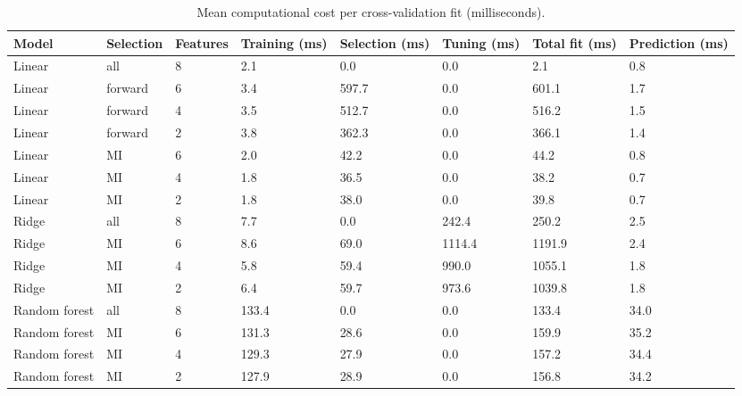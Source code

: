 \begin{table}[t]
\centering
\caption{Mean computational cost per cross-validation fit (milliseconds).}
\label{tab:cv_cost}
\begin{tabular}{llllllll}
\toprule
Model & Selection & Features & Training (ms) & Selection (ms) & Tuning (ms) & Total fit (ms) & Prediction (ms) \\
\midrule
Linear & all & 8 & 2.1 & 0.0 & 0.0 & 2.1 & 0.8 \\
Linear & forward & 6 & 3.4 & 597.7 & 0.0 & 601.1 & 1.7 \\
Linear & forward & 4 & 3.5 & 512.7 & 0.0 & 516.2 & 1.5 \\
Linear & forward & 2 & 3.8 & 362.3 & 0.0 & 366.1 & 1.4 \\
Linear & MI & 6 & 2.0 & 42.2 & 0.0 & 44.2 & 0.8 \\
Linear & MI & 4 & 1.8 & 36.5 & 0.0 & 38.2 & 0.7 \\
Linear & MI & 2 & 1.8 & 38.0 & 0.0 & 39.8 & 0.7 \\
Ridge & all & 8 & 7.7 & 0.0 & 242.4 & 250.2 & 2.5 \\
Ridge & MI & 6 & 8.6 & 69.0 & 1114.4 & 1191.9 & 2.4 \\
Ridge & MI & 4 & 5.8 & 59.4 & 990.0 & 1055.1 & 1.8 \\
Ridge & MI & 2 & 6.4 & 59.7 & 973.6 & 1039.8 & 1.8 \\
Random forest & all & 8 & 133.4 & 0.0 & 0.0 & 133.4 & 34.0 \\
Random forest & MI & 6 & 131.3 & 28.6 & 0.0 & 159.9 & 35.2 \\
Random forest & MI & 4 & 129.3 & 27.9 & 0.0 & 157.2 & 34.4 \\
Random forest & MI & 2 & 127.9 & 28.9 & 0.0 & 156.8 & 34.2 \\
\bottomrule
\end{tabular}
\end{table}
